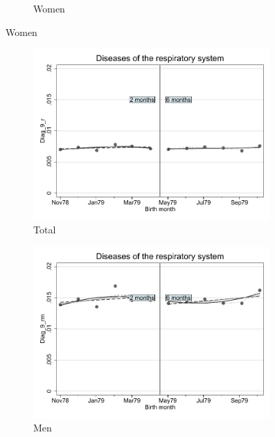 \documentclass[a4paper ]{article}
\begin{document}
\begin{figure}[h!]
\begin{subfigure}[t]{0.31\textwidth}
		\caption{Women}
	\end{subfigure}
\end{figure}
\newpage
\begin{figure}[h]
	\centering
	\begin{subfigure}[t]{0.31\textwidth}
		\centering
		\includegraphics[width=0.99\textwidth]{R1_RD_Diag_9_r_fits}
		\caption{Total}		
	\end{subfigure}
	\begin{subfigure}[t]{0.31\textwidth}
		\centering
		\includegraphics[width=0.99\textwidth]{R1_RD_Diag_9_rm_fits}
		\caption{Men}		
	\end{subfigure}
	\quad
	\begin{subfigure}[t]{0.31\textwidth}

\end{subfigure}
\end{figure}
\end{document}
